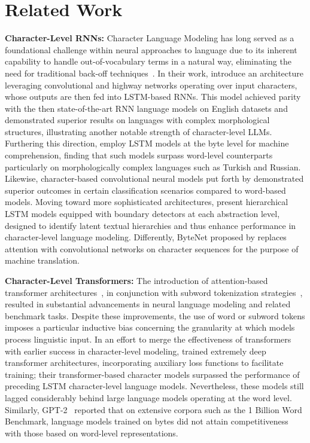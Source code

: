 \section{Related Work}
\label{section:related_work}

\textbf{Character-Level RNNs:} Character Language Modeling has long served as a foundational challenge within neural approaches to language due to its inherent capability to handle out-of-vocabulary terms in a natural way, eliminating the need for traditional back-off techniques~\citep{sutskever2011generating,mikolov2012subword,graves2013generating}. In their work, \cite{kim2016character} introduce an architecture leveraging convolutional and highway networks operating over input characters, whose outputs are then fed into LSTM-based RNNs. This model achieved parity with the then state-of-the-art RNN language models on English datasets and demonstrated superior results on languages with complex morphological structures, illustrating another notable strength of character-level LLMs. Furthering this direction, \cite{kenter2018byte} employ LSTM models at the byte level for machine comprehension, finding that such models surpass word-level counterparts particularly on morphologically complex languages such as Turkish and Russian. Likewise, character-based convolutional neural models put forth by \cite{zhang2015character} demonstrated superior outcomes in certain classification scenarios compared to word-based models. Moving toward more sophisticated architectures, \citet{chung2019hierarchical} present hierarchical LSTM models equipped with boundary detectors at each abstraction level, designed to identify latent textual hierarchies and thus enhance performance in character-level language modeling. Differently, ByteNet proposed by \cite{kalchbrenner2016neural} replaces attention with convolutional networks on character sequences for the purpose of machine translation.

\textbf{Character-Level Transformers:} The introduction of attention-based transformer architectures~\citep{vaswani2017attention}, in conjunction with subword tokenization strategies~\citep{sennrich-etal-2016-neural}, resulted in substantial advancements in neural language modeling and related benchmark tasks. Despite these improvements, the use of word or subword tokens imposes a particular inductive bias concerning the granularity at which models process linguistic input. In an effort to merge the effectiveness of transformers with earlier success in character-level modeling, \citet{al2019character} trained extremely deep transformer architectures, incorporating auxiliary loss functions to facilitate training; their transformer-based character models surpassed the performance of preceding LSTM character-level language models. Nevertheless, these models still lagged considerably behind large language models operating at the word level. Similarly, GPT-2~\citep{radfordgpt2} reported that on extensive corpora such as the 1 Billion Word Benchmark, language models trained on bytes did not attain competitiveness with those based on word-level representations.

